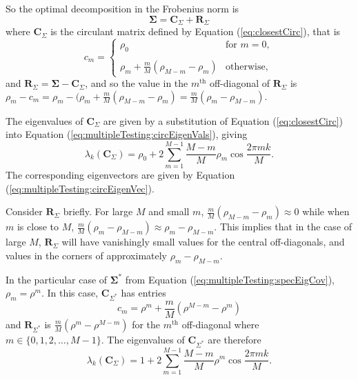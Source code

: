\documentclass[letterpaper,12pt,oneside,final]{article}
\newcommand{\m}[1]{\mathbf{#1}}               %
\newcommand{\sm}[1]{\boldsymbol{#1}}   %
\begin{document}
So the optimal decomposition in the Frobenius norm is
\begin{equation} \label{eq:sigmaCirculantDecomp}
  \sm{\Sigma} = \m{C}_{\Sigma} + \m{R}_{\Sigma}
\end{equation}
where $\m{C}_{\Sigma}$ is the circulant matrix defined by Equation (\ref{eq:closestCirc}), that is
\begin{equation*}
  c_m = \begin{cases}
    \rho_0 & \text{for } m = 0, \\
    & \\
    \rho_m + \frac{m}{M}(\rho_{M-m} - \rho_m) & \text{otherwise},
  \end{cases}
\end{equation*}
and $\m{R}_{\Sigma} = \sm{\Sigma} - \m{C}_{\Sigma}$, and so the value in the $m^{\text{th}}$ off-diagonal of $\m{R}_{\Sigma}$ is $\rho_m - c_m = \rho_m - (\rho_m + \frac{m}{M}(\rho_{M-m} - \rho_m) = \frac{m}{M} (\rho_m - \rho_{M-m}).$

The eigenvalues of $\m{C}_{\Sigma}$ are given by a substitution of Equation (\ref{eq:closestCirc}) into Equation (\ref{eq:multipleTesting:circEigenVals}), giving
\begin{equation} \label{eq:multipleTesting:circApproxEig}
  \lambda_k (\m{C}_{\Sigma}) = \rho_0 + 2 \sum_{m = 1}^{M-1} \frac{M - m}{M} \rho_m \cos \frac{2 \pi mk}{M}.
\end{equation}
The corresponding eigenvectors are given by Equation (\ref{eq:multipleTesting:circEigenVec}).

Consider $\m{R}_{\Sigma}$ briefly. For large $M$ and small $m$, $\frac{m}{M} (\rho_{M-m} - \rho_m) \approx 0$ while when $m$ is close to $M$, $\frac{m}{M} (\rho_m - \rho_{M-m}) \approx \rho_m - \rho_{M-m}$. This implies that in the case of large $M$, $\m{R}_{\Sigma}$ will have vanishingly small values for the central off-diagonals, and values in the corners of approximately $\rho_m - \rho_{M-m}$.

In the particular case of $\sm{\Sigma}^*$ from Equation (\ref{eq:multipleTesting:specEigCov}), $\rho_m = \rho^m$. In this case, $\m{C}_{\Sigma^*}$ has entries
\begin{equation*}
  c_m =  \rho^m + \frac{m}{M}(\rho^{M-m} - \rho^m)
\end{equation*}
and $\m{R}_{\Sigma^*}$ is $\frac{m}{M} (\rho^m - \rho^{M-m})$ for the $m^{\text{th}}$ off-diagonal where $m \in \{0, 1, 2, \dots, M-1\}$. The eigenvalues of $\m{C}_{\Sigma^*}$ are therefore
\begin{equation*}
  \lambda_k (\m{C}_{\Sigma}) = 1 + 2 \sum_{m = 1}^{M-1} \frac{M - m}{M} \rho^m \cos \frac{2 \pi mk}{M}.
\end{equation*}
\end{document}
